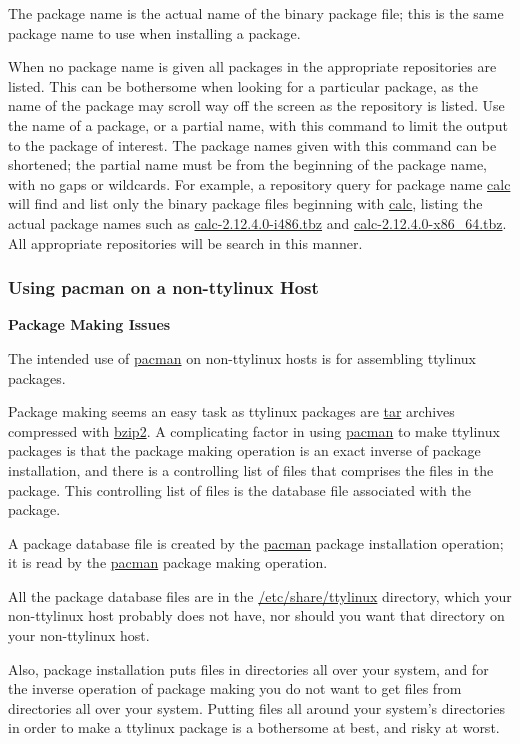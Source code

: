 \documentclass[10pt]{article}
\begin{document}
The package name is the actual name of the binary package file; this is the
same package name to use when installing a package.

When no package name is given all packages in the appropriate repositories are
listed. This can be bothersome when looking for a particular package, as the
name of the package may scroll way off the screen as the repository is listed.
Use the name of a package, or a partial name, with this command to limit the
output to the package of interest. The package names given with this command
can be shortened; the partial name must be from the beginning of the package
name, with no gaps or wildcards. For example, a repository query for package
name \url{calc} will find and list only the binary package files beginning with
\url{calc}, listing the actual package names such as
\url{calc-2.12.4.0-i486.tbz} and \url{calc-2.12.4.0-x86_64.tbz}. All
appropriate repositories will be search in this manner.

\subsubsection{Using pacman on a non-ttylinux Host}
\label{foreignpacman}

{\bf Package Making Issues}

The intended use of \url{pacman} on non-ttylinux hosts is for assembling
ttylinux packages.

Package making seems an easy task as ttylinux packages are \url{tar} archives
compressed with \url{bzip2}. A complicating factor in using \url{pacman} to
make ttylinux packages is that the package making operation is an exact inverse
of package installation, and there is a controlling list of files that comprises
the files in the package. This controlling list of files is the database file
associated with the package.

A package database file is created by the \url{pacman} package installation
operation; it is read by the \url{pacman} package making operation.

All the package database files are in the \url{/etc/share/ttylinux} directory,
which your non-ttylinux host probably does not have, nor should you want that
directory on your non-ttylinux host.

Also, package installation puts files in directories all over your system, and
for the inverse operation of package making you do not want to get files from
directories all over your system. Putting files all around your system's
directories in order to make a ttylinux package is a bothersome at best, and
risky at worst.
\end{document}
